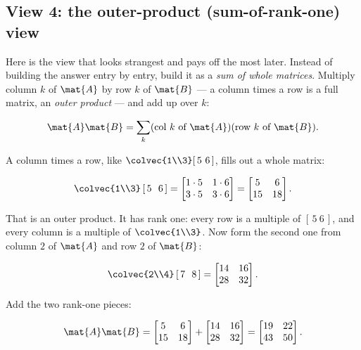 \subsection{View 4: the outer-product (sum-of-rank-one) view}

Here is the view that looks strangest and pays off the most later. Instead of building
the answer entry by entry, build it as a \emph{sum of whole matrices}. Multiply column
$k$ of $\mat{A}$ by row $k$ of $\mat{B}$ --- a column times a row is a full matrix, an
\emph{outer product} --- and add up over $k$:

\[
\mat{A}\mat{B} = \sum_{k} (\text{col } k \text{ of } \mat{A})(\text{row } k \text{ of } \mat{B}).
\]

A column times a row, like $\colvec{1\\3}[\,5 \ 6\,]$, fills out a whole matrix:

\[
\colvec{1\\3}\,[\,5\ \ 6\,] = \begin{bmatrix} 1\cdot5 & 1\cdot6 \\ 3\cdot5 & 3\cdot6 \end{bmatrix}
= \begin{bmatrix} 5 & 6 \\ 15 & 18 \end{bmatrix}.
\]

That is an outer product. It has rank one: every row is a multiple of $[\,5\ 6\,]$,
and every column is a multiple of $\colvec{1\\3}$. Now form the second one from column
$2$ of $\mat{A}$ and row $2$ of $\mat{B}$:

\[
\colvec{2\\4}\,[\,7\ \ 8\,] = \begin{bmatrix} 14 & 16 \\ 28 & 32 \end{bmatrix}.
\]

Add the two rank-one pieces:

\[
\mat{A}\mat{B} = \begin{bmatrix} 5 & 6 \\ 15 & 18 \end{bmatrix}
+ \begin{bmatrix} 14 & 16 \\ 28 & 32 \end{bmatrix}
= \begin{bmatrix} 19 & 22 \\ 43 & 50 \end{bmatrix}.
\]

